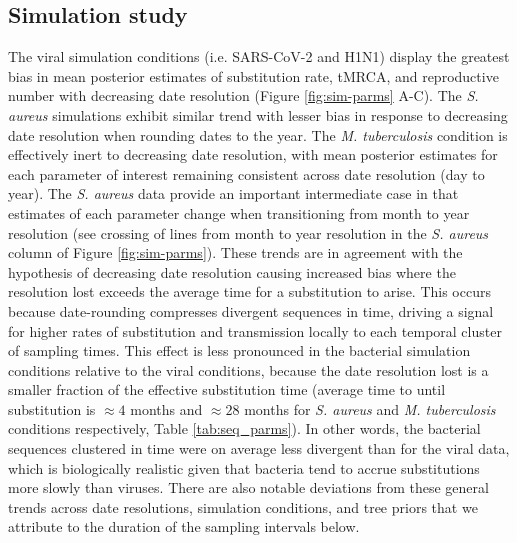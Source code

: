 \documentclass[12pt]{article}
\begin{document}
\begin{spacing}{2}
\subsection*{Simulation study}
The viral simulation conditions (i.e. SARS-CoV-2 and H1N1) display the greatest bias in mean posterior estimates of substitution rate, tMRCA, and reproductive number with decreasing date resolution (Figure \ref{fig:sim-parms} A-C). The \textit{S. aureus} simulations exhibit  similar trend with lesser bias in response to decreasing date resolution when rounding dates to the year. The \textit{M. tuberculosis} condition is effectively inert to decreasing date resolution, with mean posterior estimates for each parameter of interest remaining consistent across date resolution (day to year). The \textit{S. aureus} data provide an important intermediate case in that estimates of each parameter change when transitioning from month to year resolution (see crossing of lines from month to year resolution in the \textit{S. aureus} column of Figure \ref{fig:sim-parms}). These trends are in agreement with the hypothesis of decreasing date resolution causing increased bias where the resolution lost exceeds the average time for a substitution to arise. This occurs because date-rounding compresses divergent sequences in time, driving a signal for higher rates of substitution and transmission locally to each temporal cluster of sampling times.  This effect is less pronounced in the bacterial simulation conditions relative to the viral conditions, because the date resolution lost is a smaller fraction of the effective substitution time (average time to until substitution is $\approx4$ months and $\approx28$ months for \textit{S. aureus} and \textit{M. tuberculosis} conditions respectively, Table \ref{tab:seq_parms}). In other words, the bacterial sequences clustered in time were on average less divergent than for the viral data, which is biologically realistic given that bacteria tend to accrue substitutions more slowly than viruses. There are also notable deviations from these general trends across date resolutions, simulation conditions, and tree priors that we attribute to the duration of the sampling intervals below.


\end{spacing}
\end{document}
